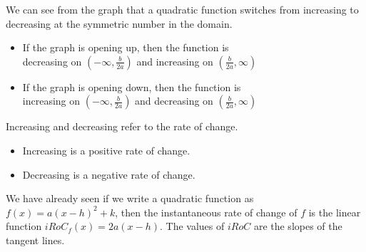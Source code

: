 \documentclass{ximera}
\begin{document}
We can see from the graph that a quadratic function switches from increasing to decreasing at the symmetric number in the domain.


\begin{itemize}
\item If the graph is opening up, then the function is \\

decreasing on $\left( -\infty, \frac{b}{2a} \right)$ and increasing on $\left( \frac{b}{2a}, \infty \right)$

\item If the graph is opening down, then the function is \\

increasing on $\left( -\infty, \frac{b}{2a} \right)$ and decreasing on $\left( \frac{b}{2a}, \infty \right)$
\end{itemize}





Increasing and decreasing refer to the rate of change.


\begin{itemize}
\item Increasing is a positive rate of change.
\item Decreasing is a negative rate of change.
\end{itemize}


We have already seen if we write a quadratic function as $f(x) = a (x - h)^2 + k$, then the instantaneous rate of change of $f$ is the linear function $iRoC_f(x) = 2 a (x - h)$. The values of $iRoC$ are the slopes of the tangent lines.
\end{document}

